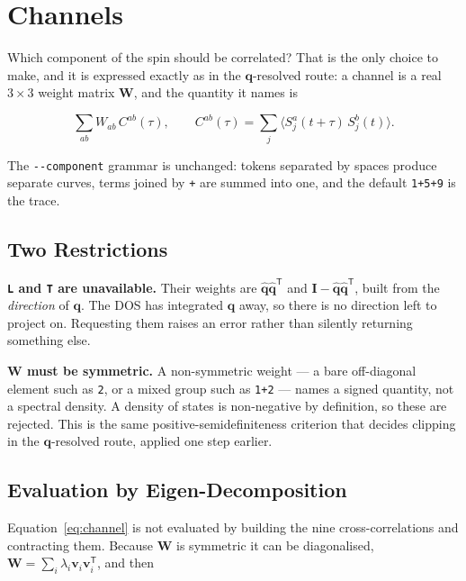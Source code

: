 \documentclass[12pt, a4paper, oneside]{article}
\newcommand{\qvec}{\mathbf{q}}
\newcommand{\vvec}{\mathbf{v}}
\newcommand{\qhat}{\hat{\mathbf{q}}}
\newcommand{\field}{S}
\newcommand{\Wmat}{\mathbf{W}}
\newcommand{\Imat}{\mathbf{I}}
\begin{document}
\section{Channels}
\label{sec:channels}

Which component of the spin should be correlated? That is the only choice to
make, and it is expressed exactly as in the $\qvec$-resolved route: a channel
is a real $3\times3$ weight matrix $\Wmat$, and the quantity it names is

\begin{equation}
\boxed{
    \sum_{ab} W_{ab}\,C^{ab}(\tau),
    \qquad
    C^{ab}(\tau) = \sum_j \bigl\langle \field_j^a(t{+}\tau)\,\field_j^b(t)\bigr\rangle .
}
\label{eq:channel}
\end{equation}

The \texttt{-\/-component} grammar is unchanged: tokens separated by spaces
produce separate curves, terms joined by \texttt{+} are summed into one, and
the default \texttt{1+5+9} is the trace.

\subsection{Two Restrictions}

\textbf{\texttt{L} and \texttt{T} are unavailable.} Their weights are
$\qhat\qhat^{\mathsf T}$ and $\Imat-\qhat\qhat^{\mathsf T}$, built from the
\emph{direction} of $\qvec$. The DOS has integrated $\qvec$ away, so there is
no direction left to project on. Requesting them raises an error rather than
silently returning something else.

\textbf{$\Wmat$ must be symmetric.} A non-symmetric weight --- a bare
off-diagonal element such as \texttt{2}, or a mixed group such as \texttt{1+2}
--- names a signed quantity, not a spectral density. A density of states is
non-negative by definition, so these are rejected. This is the same
positive-semidefiniteness criterion that decides clipping in the
$\qvec$-resolved route, applied one step earlier.

\subsection{Evaluation by Eigen-Decomposition}

Equation~\eqref{eq:channel} is not evaluated by building the nine
cross-correlations and contracting them. Because $\Wmat$ is symmetric it can be
diagonalised, $\Wmat = \sum_i \lambda_i \vvec_i\vvec_i^{\mathsf T}$, and then
\end{document}
